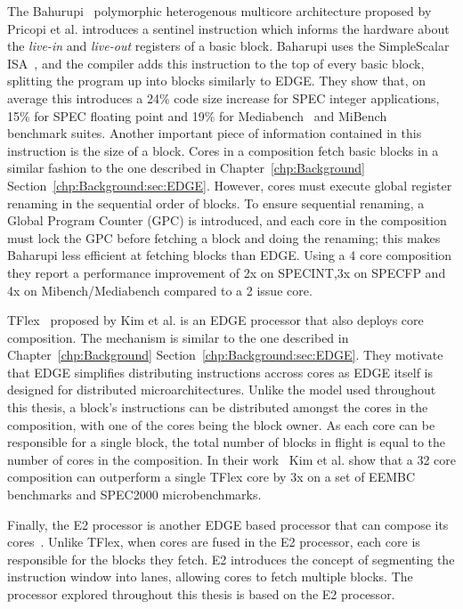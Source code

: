 The Bahurupi~\cite{pricopi2012bahurupi} polymorphic heterogenous multicore architecture proposed by Pricopi et al. introduces a sentinel instruction which informs the hardware about the \textit{live-in} and \textit{live-out} registers of a basic block.
Baharupi uses the SimpleScalar ISA~\cite{burger1997simplescalar}, and the compiler adds this instruction to the top of every basic block, splitting the program up into blocks similarly to EDGE.
They show that, on average this introduces a 24\% code size increase for SPEC integer applications, 15\% for SPEC floating point and 19\% for Mediabench~\cite{mediabench} and MiBench~\cite{mibench} benchmark suites.
Another important piece of information contained in this instruction is the size of a block.
Cores in a composition fetch basic blocks in a similar fashion to the one described in Chapter~\ref{chp:Background} Section~\ref{chp:Background:sec:EDGE}.
However, cores must execute global register renaming in the sequential order of blocks.
To ensure sequential renaming, a Global Program Counter (GPC) is introduced, and each core in the composition must lock the GPC before fetching a block and doing the renaming; this makes Baharupi less efficient at fetching blocks than EDGE.
Using a 4 core composition they report a performance improvement of 2x on SPECINT,3x on SPECFP and 4x on Mibench/Mediabench compared to a 2 issue core. 

TFlex~\cite{kim2007tflex} proposed by Kim et al. is an EDGE processor that also deploys core composition.
The mechanism is similar to the one described in Chapter~\ref{chp:Background} Section~\ref{chp:Background:sec:EDGE}.
They motivate that EDGE simplifies distributing instructions accross cores as EDGE itself is designed for distributed microarchitectures.
Unlike the model used throughout this thesis, a block's instructions can be distributed amongst the cores in the composition, with one of the cores being the block owner.
As each core can be responsible for a single block, the total number of blocks in flight is equal to the number of cores in the composition.
In their work~\cite{kim2007tflex} Kim et al. show that a 32 core composition can outperform a single TFlex core by 3x on a set of EEMBC benchmarks and SPEC2000 microbenchmarks.

Finally, the E2 processor is another EDGE based processor that can compose its cores~\cite{putnam2010e2}.
Unlike TFlex, when cores are fused in the E2 processor, each core is responsible for the blocks they fetch.
E2 introduces the concept of segmenting the instruction window into lanes, allowing cores to fetch multiple blocks.
The processor explored throughout this thesis is based on the E2 processor.

